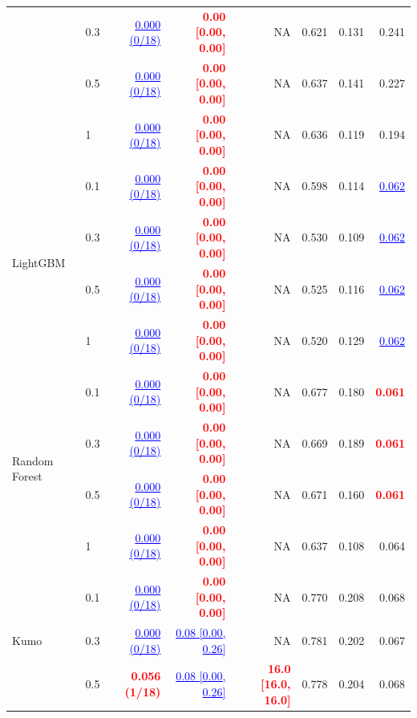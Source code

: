 \begin{table}[pos=!htbp,align=\centering]
{\begin{tabular}{llrrrrrr}
 & 0.3 & \textcolor{blue}{\underline{0.000 (0/18)}} & \textcolor{red}{\textbf{0.00 [0.00, 0.00]}} & NA & 0.621 & 0.131 & 0.241 \\
 & 0.5 & \textcolor{blue}{\underline{0.000 (0/18)}} & \textcolor{red}{\textbf{0.00 [0.00, 0.00]}} & NA & 0.637 & 0.141 & 0.227 \\
 & 1 & \textcolor{blue}{\underline{0.000 (0/18)}} & \textcolor{red}{\textbf{0.00 [0.00, 0.00]}} & NA & 0.636 & 0.119 & 0.194 \\
\midrule
\multirow{4}{*}{LightGBM} & 0.1 & \textcolor{blue}{\underline{0.000 (0/18)}} & \textcolor{red}{\textbf{0.00 [0.00, 0.00]}} & NA & 0.598 & 0.114 & \textcolor{blue}{\underline{0.062}} \\
 & 0.3 & \textcolor{blue}{\underline{0.000 (0/18)}} & \textcolor{red}{\textbf{0.00 [0.00, 0.00]}} & NA & 0.530 & 0.109 & \textcolor{blue}{\underline{0.062}} \\
 & 0.5 & \textcolor{blue}{\underline{0.000 (0/18)}} & \textcolor{red}{\textbf{0.00 [0.00, 0.00]}} & NA & 0.525 & 0.116 & \textcolor{blue}{\underline{0.062}} \\
 & 1 & \textcolor{blue}{\underline{0.000 (0/18)}} & \textcolor{red}{\textbf{0.00 [0.00, 0.00]}} & NA & 0.520 & 0.129 & \textcolor{blue}{\underline{0.062}} \\
\midrule
\multirow{4}{*}{Random Forest} & 0.1 & \textcolor{blue}{\underline{0.000 (0/18)}} & \textcolor{red}{\textbf{0.00 [0.00, 0.00]}} & NA & 0.677 & 0.180 & \textcolor{red}{\textbf{0.061}} \\
 & 0.3 & \textcolor{blue}{\underline{0.000 (0/18)}} & \textcolor{red}{\textbf{0.00 [0.00, 0.00]}} & NA & 0.669 & 0.189 & \textcolor{red}{\textbf{0.061}} \\
 & 0.5 & \textcolor{blue}{\underline{0.000 (0/18)}} & \textcolor{red}{\textbf{0.00 [0.00, 0.00]}} & NA & 0.671 & 0.160 & \textcolor{red}{\textbf{0.061}} \\
 & 1 & \textcolor{blue}{\underline{0.000 (0/18)}} & \textcolor{red}{\textbf{0.00 [0.00, 0.00]}} & NA & 0.637 & 0.108 & 0.064 \\
\midrule
\multirow{4}{*}{Kumo} & 0.1 & \textcolor{blue}{\underline{0.000 (0/18)}} & \textcolor{red}{\textbf{0.00 [0.00, 0.00]}} & NA & 0.770 & 0.208 & 0.068 \\
 & 0.3 & \textcolor{blue}{\underline{0.000 (0/18)}} & \textcolor{blue}{\underline{0.08 [0.00, 0.26]}} & NA & 0.781 & 0.202 & 0.067 \\
 & 0.5 & \textcolor{red}{\textbf{0.056 (1/18)}} & \textcolor{blue}{\underline{0.08 [0.00, 0.26]}} & \textcolor{red}{\textbf{16.0 [16.0, 16.0]}} & 0.778 & 0.204 & 0.068 \\

\end{tabular}}
\end{table}
